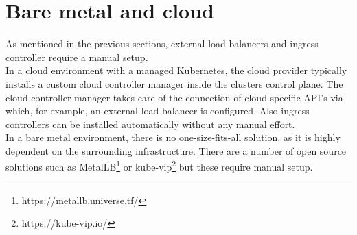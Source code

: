 \section{Bare metal and cloud}

As mentioned in the previous sections, external load balancers and ingress controller require a manual setup.
\\
In a cloud environment with a managed Kubernetes, the cloud provider typically installs a custom cloud controller manager inside the clusters control plane.
The cloud controller manager takes care of the connection of cloud-specific API's via which, for example, an external load balancer is configured.
Also ingress controllers can be installed automatically without any manual effort.
\\
In a bare metal environment, there is no one-size-fits-all solution, as it is highly dependent on the surrounding infrastructure.
There are a number of open source solutions such as MetalLB\footnote{https://metallb.universe.tf/} or kube-vip\footnote{https://kube-vip.io/} but these require manual setup.

